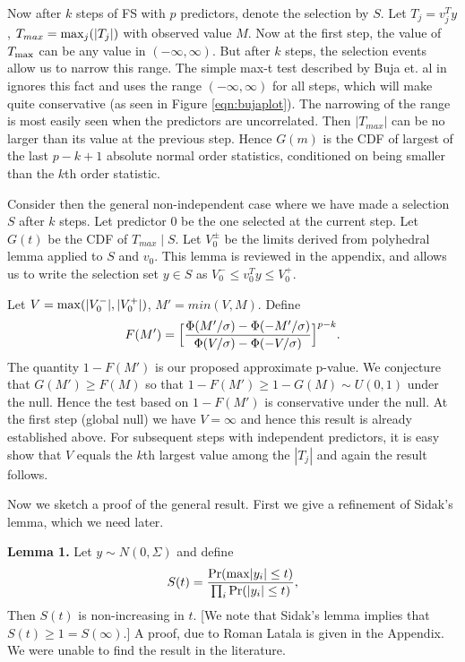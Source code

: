 \documentclass{article}
\begin{document}
Now after  $k$ steps of FS with $p$ predictors, denote the selection by $S$. Let $T_j=v_j^Ty$,  $T_{max}={\rm max}_j(|T_j|)$
with observed value $M$. Now at the first step, the value of $T_{\rm max}$ can be any value in $(-\infty, \infty)$.  But after $k$ steps, the selection  events allow us to narrow this range.
The simple max-t test  described by Buja et. al in \cite{LTTT2014} ignores this fact and uses the range $(-\infty, \infty)$ for all steps, which will make quite conservative (as seen in Figure \ref{eqn:bujaplot}).
The narrowing of the range is most easily seen when the predictors are uncorrelated. 
Then $|T_{max}|$ can be no larger than its value at the previous step.  Hence $G(m)$ is the  CDF of largest of the last $p - k + 1$ 
absolute normal order statistics, conditioned on being smaller than the $k$th  order statistic.

Consider then the general non-independent  case where we have made a selection $S$ after $k$ steps.
Let predictor $0$ be the one selected at the current step.
Let $G(t)$ be the CDF of $T_{max} \mid S$. 
Let $V_0^\pm$ be the limits derived from polyhedral lemma applied to $S$ and $v_0$.
This lemma is reviewed in the appendix, and allows us to write the selection set $y \in S$  as
$V_0^- \leq v_0^Ty\leq V_0^+$.


Let $V={\rm max}(|V_0^-|, |V_0^+|)$, $M'=min(V,M)$.
Define
\begin{eqnarray}
F(M')=\Bigl[\frac{\Phi(M'/\sigma)-\Phi(-M'/\sigma)}{\Phi(V/\sigma)-\Phi(-V/\sigma)}\Bigr]^{p-k}.
\label{eq:approx}
\end{eqnarray}
The quantity $1-F(M')$ is our proposed approximate p-value.
We conjecture that $G(M') \geq F(M)$  so that $1-F(M')  \geq 1-G(M) \sim U(0,1)$ under the null. Hence the test based on $1-F(M')$ is conservative under the null.
At the first step (global null)  we have $V=\infty$ and hence this result is already established above. For subsequent steps with independent predictors, it is easy show that 
$V$ equals the $k$th  largest value among the $|T_j|$ and again the result follows.



Now we sketch a proof of the general result.
First we give  a refinement of  Sidak's lemma, which we need later.

\medskip

{\bf Lemma 1.} 
Let $y \sim N(0,\Sigma)$ and define
$$S(t) = \frac{\Pr({\rm max} |y_i| \leq t )}{\prod_i \Pr( |y_i| \leq  t )},$$
Then $S(t)$ is non-increasing in $t$.  [We note that Sidak's lemma implies that $S(t) \geq 1= S(\infty)$.]
A proof, due to Roman Latala is given in the Appendix. We were unable to find the result in the literature.
\end{document}
